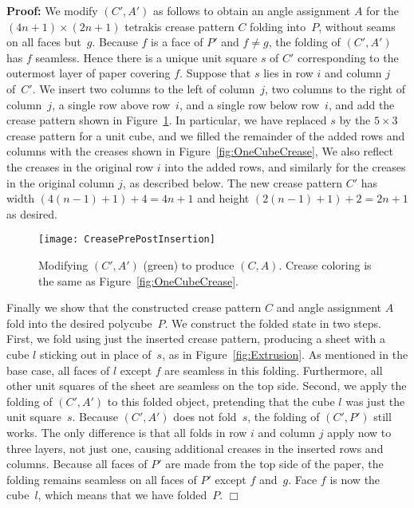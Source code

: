 \documentclass[11pt]{article}
\newcommand{\figlab}[1]{\label{fig:#1}}
\newcommand{\figref}[1]{\ref{fig:#1}}
\newenvironment{proof}{\noindent\textbf{Proof: }\ignorespaces}
  {\hspace*{\fill}$\Box$\medskip}
\begin{document}
\begin{proof}
  We modify $(C',A')$ as follows to obtain an angle assignment $A$ for the
  $(4 n + 1) \times (2 n + 1)$ tetrakis crease pattern $C$ folding into~$P$,
  without seams on all faces but~$g$.
  Because $f$ is a face of $P'$ and $f \neq g$,
  the folding of $(C',A')$ has $f$ seamless.
  Hence there is a unique unit square $s$ of $C'$
  corresponding to the outermost layer of paper covering $f$.
  Suppose that $s$ lies in row $i$ and column $j$ of~$C'$.
  We insert two columns to the left of column~$j$, two columns to the right of
  column~$j$, a single row above row~$i$, and a single row below row~$i$,
  and add the crease pattern shown in Figure~\figref{InsertionStep}.
  In particular, we have replaced $s$ by the $5 \times 3$ crease pattern for a
  unit cube, and we filled the remainder of the added rows and columns
  with the creases shown in Figure~\figref{OneCubeCrease},
  We also reflect the creases in the original row $i$ into the added rows,
  and similarly for the creases in the original column $j$, as described below.
  The new crease pattern $C'$ has width $(4(n-1)+1)+4 = 4 n + 1$
  and height $(2(n-1)+1)+2 = 2 n + 1$ as desired.

\begin{figure}[htbp]
\centering
\texttt{[image: CreasePrePostInsertion]}
\caption{Modifying $(C',A')$ (green) to produce $(C,A)$.
  Crease coloring is the same as Figure~\protect\figref{OneCubeCrease}.}
\figlab{InsertionStep}
\end{figure}


  Finally we show that the constructed crease pattern $C$ and
  angle assignment $A$ fold into the desired polycube~$P$.
  We construct the folded state in two steps.
  First, we fold using just the inserted crease pattern,
  producing a sheet with a cube $l$ sticking out in place of~$s$,
  as in Figure~\figref{Extrusion}.
  As mentioned in the base case, all faces of $l$ except $f$
  are seamless in this folding.
  Furthermore, all other unit squares of the sheet
  are seamless on the top side.
  Second, we apply the folding of $(C',A')$ to this folded object,
  pretending that the cube $l$ was just the unit square~$s$.
  Because $(C',A')$ does not fold~$s$, the folding of $(C',P')$ still works.
  The only difference is that all folds in row $i$ and column $j$
  apply now to three layers, not just one, causing additional creases
  in the inserted rows and columns.
  Because all faces of $P'$ are made from the top side of the paper,
  the folding remains seamless on all faces of $P'$ except $f$ and~$g$.
  Face $f$ is now the cube~$l$, which means that we have folded~$P$.
\end{proof}
\end{document}
